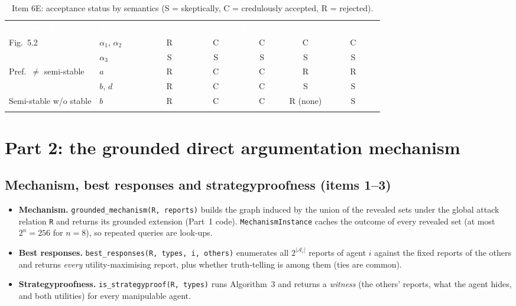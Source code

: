 \documentclass[10pt,a4paper]{article}
\newcommand{\thd}[1]{\textcolor{white}{\sffamily\bfseries #1}}
\newcommand{\code}[1]{\textcolor{brand!85!black}{\texttt{#1}}}
\newcommand{\tabend}{\arrayrulecolor{brand}\specialrule{0.8pt}{0pt}{0pt}\arrayrulecolor{black}}
\newcommand{\Args}{\mathcal{A}}
\newcommand{\al}[1]{\alpha_{#1}}
\begin{document}
\begin{table}[H]\centering
\caption{Item 6E: acceptance status by semantics (S = skeptically, C = credulously accepted, R = rejected).}\label{tab:acc}
\small
\begin{tabular}{l l c c c c c}
\rowcolor{brand}\thd{Framework} & \thd{Argument} & \thd{grounded} & \thd{complete} & \thd{preferred} & \thd{stable} & \thd{semi-stable}\\
\rowcolor{white} Fig.~5.2 & $\al1$, $\al2$ & R & C & C & C & C\\
\rowcolor{white}         & $\al3$ & S & S & S & S & S\\
\rowcolor{rowalt} Pref.\ $\ne$ semi-stable & $a$ & R & C & C & R & R\\
\rowcolor{rowalt}         & $b$, $d$ & R & C & C & S & S\\
\rowcolor{white} Semi-stable w/o stable & $b$ & R & C & C & R (none) & S\\
\tabend
\end{tabular}
\end{table}

\section{Part 2: the grounded direct argumentation mechanism}\label{sec:part2}

\subsection{Mechanism, best responses and strategyproofness (items 1--3)}

\begin{itemize}
  \item \textbf{Mechanism.} \code{grounded\_mechanism(R, reports)} builds the graph induced by the union of the revealed sets
        under the global attack relation \code{R} and returns its grounded extension (Part~1 code).
        \code{MechanismInstance} caches the outcome of every revealed set (at most $2^n=256$ for $n=8$), so repeated queries are
        look-ups.
  \item \textbf{Best responses.} \code{best\_responses(R, types, i, others)} enumerates all $2^{|\Args_i|}$ reports of agent $i$
        against the fixed reports of the others and returns \emph{every} utility-maximising report, plus whether truth-telling
        is among them (ties are common).
  \item \textbf{Strategyproofness.} \code{is\_strategyproof(R, types)} runs Algorithm~3 and returns a \emph{witness} (the
        others' reports, what the agent hides, and both utilities) for every manipulable agent.
\end{itemize}
\end{document}

